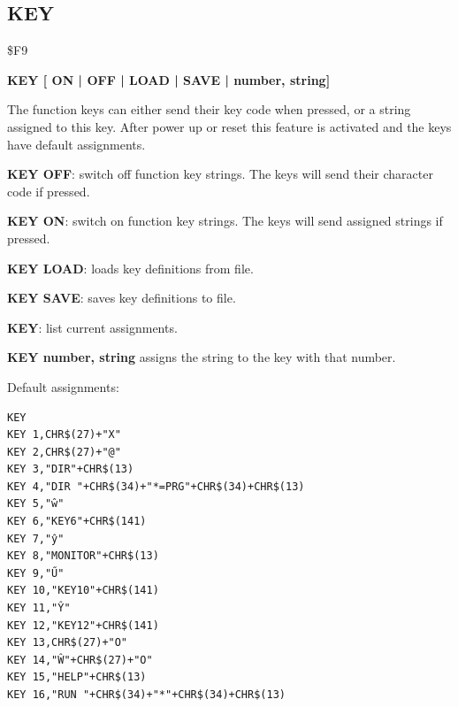 \subsection{KEY}
\begin{description}[leftmargin=2cm,style=nextline]
\item [Token:] \$F9
\item [Format:] {\bf KEY [ ON | OFF | LOAD | SAVE | number, string]}
\item [Usage:] The function keys can either send their key code
               when pressed, or a string assigned to this key.
               After power up or reset this feature is activated
               and the keys have default assignments.

               {\bf KEY OFF}: switch off function key strings.
               The keys will send their character code if pressed.

               {\bf KEY ON}: switch on function key strings.
               The keys will send assigned strings if pressed.

               {\bf KEY LOAD}: loads key definitions from file.

               {\bf KEY SAVE}: saves key definitions to file.

               {\bf KEY}: list current assignments.

               {\bf KEY number, string} assigns the string to
               the key with that number.

               Default assignments:

\begin{tcolorbox}[colback=black,coltext=white]
\verbatimfont{\codefont}
\begin{verbatim}
KEY
KEY 1,CHR$(27)+"X"
KEY 2,CHR$(27)+"@"
KEY 3,"DIR"+CHR$(13)
KEY 4,"DIR "+CHR$(34)+"*=PRG"+CHR$(34)+CHR$(13)
KEY 5,"ŵ"
KEY 6,"KEY6"+CHR$(141)
KEY 7,"ŷ"
KEY 8,"MONITOR"+CHR$(13)
KEY 9,"Ű"
KEY 10,"KEY10"+CHR$(141)
KEY 11,"Ŷ"
KEY 12,"KEY12"+CHR$(141)
KEY 13,CHR$(27)+"O"
KEY 14,"Ŵ"+CHR$(27)+"O"
KEY 15,"HELP"+CHR$(13)
KEY 16,"RUN "+CHR$(34)+"*"+CHR$(34)+CHR$(13)
\end{verbatim}
\end{tcolorbox}


\end{description}
